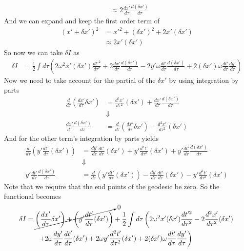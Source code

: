 \documentclass[11pt]{article}
\numberwithin{equation}{section}
\begin{document}
\begin{enumerate}[(a)]
\begin{align*}
&\approx 2\frac{dx'}{d\tau}\frac{d(\delta x')}{d\tau}
\end{align*}
And we can expand and keep the first order term of
\begin{align*}
(x'+\delta x')^2 &= x'^2 + (\delta x')^2 + 2x'(\delta x')\\
&\approx 2x'(\delta x')
\end{align*}
So now we can take $\delta I$ as
\begin{align*}
\delta I &= \frac{1}{2}\int d\tau \left(2\omega^2x'(\delta x')\frac{dt'^2}{d\tau^2} + 2\frac{dx'}{d\tau}\frac{d(\delta x')}{d\tau}  - 2y'\omega\frac{dt'}{d\tau}\frac{d(\delta x')}{d\tau} + 2(\delta x')\omega\frac{dt'}{d\tau}\frac{dy'}{d\tau}\right)
\end{align*}
Now we need to take account for the partial of the $\delta x'$ by using integration by parts 
\begin{align*}
\frac{d}{d\tau}\left(\frac{dx'}{d\tau} \delta x'\right) &= \frac{d^2x'}{d\tau^2}(\delta x') + \frac{dx'}{d\tau}\frac{d(\delta x')}{d\tau}\\
&\Downarrow\\
\frac{dx'}{d\tau}\frac{d(\delta x')}{d\tau} &= \frac{d}{d\tau}\left(\frac{dx'}{d\tau} \delta x'\right) - \frac{d^2x'}{d\tau^2}(\delta x') 
\end{align*}
And for the other term's integration by parts yields 
\begin{align*}
\frac{d}{d\tau}\left(y'\frac{dt'}{d\tau}(\delta x')\right) &= \frac{dy'}{d\tau}\frac{dt'}{d\tau}(\delta x') + y'\frac{d^2t'}{d\tau^2}(\delta x') + y'\frac{dt'}{d\tau}\frac{d(\delta x')}{d\tau}\\
&\Downarrow\\
y'\frac{dt'}{d\tau}\frac{d(\delta x')}{d\tau} &= \frac{d}{d\tau}\left(y'\frac{dt'}{d\tau}(\delta x')\right) - \frac{dy'}{d\tau}\frac{dt'}{d\tau}(\delta x') - y'\frac{d^2t'}{d\tau^2}(\delta x') 
\end{align*}
Note that we require that the end points of the geodesic be zero. So the functional becomes 
\begin{align*}
\delta I &= \cancelto{0}{\left(\frac{dx'}{d\tau} \delta x'\right) + \left(y'\frac{dt'}{d\tau}(\delta x')\right)} + \frac{1}{2}\int d\tau \left(2\omega^2x'(\delta x')\frac{dt'^2}{d\tau^2} - 2\frac{d^2x'}{d\tau^2}(\delta x') \right. \\
&\ \ \ \ \ \left. + 2\omega\frac{dy'}{d\tau}\frac{dt'}{d\tau}(\delta x') + 2\omega y'\frac{d^2t'}{d\tau^2}(\delta x') + 2(\delta x')\omega\frac{dt'}{d\tau}\frac{dy'}{d\tau}\right)\\

\end{align*}
\end{enumerate}
\end{document}
